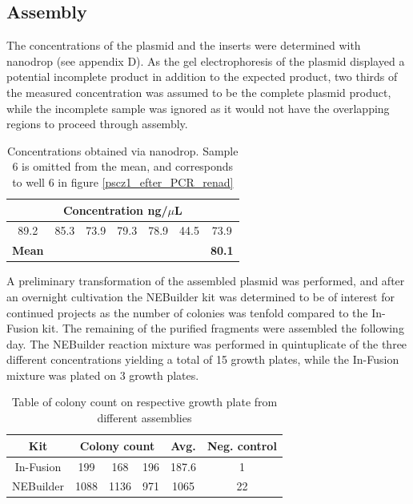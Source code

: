 \documentclass{article}
\begin{document}
\begin{multicols}{2}
	\subsection{Assembly}
	The concentrations of the plasmid and the inserts were determined with nanodrop (see appendix D). As the gel electrophoresis of the plasmid displayed a potential incomplete product in addition to the expected product, two thirds of the measured concentration was assumed to be the complete plasmid product, while the incomplete sample was ignored as it would not have the overlapping regions to proceed through assembly.
	
	\begin{table}[H]
		\begin{center}
			\caption{Concentrations obtained via nanodrop. Sample 6 is omitted from the mean, and corresponds to well 6 in figure \ref{pscz1_efter_PCR_renad}}
			\label{nanodrop_tab}
			
			\begin{tabular}{c|c|c|c|c|c|c}
				\toprule
				\multicolumn{7}{c}{\textbf{Concentration ng/$\mu$L}} \\
				\midrule
				89.2 & 85.3 & 73.9 & 79.3 & 78.9 & 44.5 & 73.9 \\
				\bottomrule
				\multicolumn{1}{c}{\textbf{Mean}} & \multicolumn{5}{c}{} & \textbf{80.1} \\
			\end{tabular}
		\end{center}
	\end{table}

	A preliminary transformation of the assembled plasmid was performed, and after an overnight cultivation the NEBuilder kit was determined to be of interest for continued projects as the number of colonies was tenfold compared to the In-Fusion kit. The remaining of the purified fragments were assembled the following day. The NEBuilder reaction mixture was performed in quintuplicate of the three different concentrations yielding a total of 15 growth plates, while the In-Fusion mixture was plated on 3 growth plates.
	
	\setlength{\tabcolsep}{4pt}
	\begin{table}[H]
		\begin{center}
			\caption{Table of colony count on respective growth plate from different assemblies}	
			\begin{tabular}{c|c c c|c|c}
				\toprule
				\textbf{Kit} & \multicolumn{3}{c|}{\textbf{Colony count}} & \textbf{Avg.} & \textbf{Neg. control} \\
				\midrule
				In-Fusion & 199 & 168 & 196 & 187.6 & 1 \\
				NEBuilder & 1088 & 1136 & 971 & 1065 & 22 \\
				\bottomrule
			\end{tabular}
		\end{center}
	\end{table}
	\setlength{\tabcolsep}{6pt}


\end{multicols}
\end{document}

